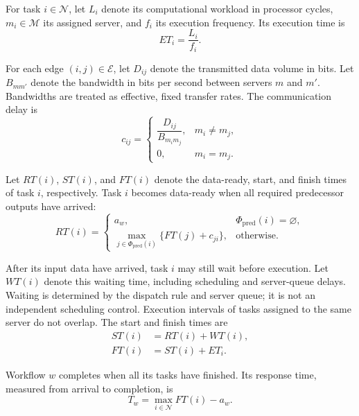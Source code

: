 \documentclass[lettersize,journal]{IEEEtran}
\begin{document}
For task $i\in\mathcal{N}$, let $L_i$ denote its computational
workload in processor cycles, $m_i\in\mathcal{M}$ its assigned
server, and $f_i$ its execution frequency.
Its execution time is
\begin{equation}
    ET_i=\frac{L_i}{f_i}.
    \label{eq:execution_time}
\end{equation}

For each edge $(i,j)\in\mathcal{E}$, let $D_{ij}$ denote
the transmitted data volume in bits.
Let $B_{mm'}$ denote the bandwidth in bits per second
between servers $m$ and $m'$. Bandwidths are treated as effective,
fixed transfer rates.
The communication delay is
\begin{equation}
    c_{ij}=
    \begin{cases}
        \dfrac{D_{ij}}{B_{m_i m_j}}, & m_i\neq m_j,\\[2mm]
        0, & m_i=m_j.
    \end{cases}
    \label{eq:communication_delay}
\end{equation}

Let $RT(i)$, $ST(i)$, and $FT(i)$ denote the data-ready,
start, and finish times of task $i$, respectively.
Task $i$ becomes data-ready when all required predecessor
outputs have arrived:
\begin{equation}
    RT(i)=
    \begin{cases}
        a_w, & \Phi_{\mathrm{pred}}(i)=\varnothing,\\[2mm]
        \displaystyle
        \max_{j\in\Phi_{\mathrm{pred}}(i)}
        \{FT(j)+c_{ji}\}, & \text{otherwise}.
    \end{cases}
    \label{eq:ready_time}
\end{equation}

After its input data have arrived, task $i$ may still wait
before execution. Let $WT(i)$ denote this waiting time,
including scheduling and server-queue delays.
Waiting is determined by the dispatch rule and server queue; it is
not an independent scheduling control. Execution intervals of tasks
assigned to the same server do not overlap.
The start and finish times are
\begin{align}
    ST(i)&=RT(i)+WT(i), \label{eq:start_time}\\
    FT(i)&=ST(i)+ET_i. \label{eq:finish_time}
\end{align}

Workflow $w$ completes when all its tasks have finished.
Its response time, measured from arrival to completion, is
\begin{equation}
    T_w=\max_{i\in\mathcal{N}}FT(i)-a_w.
    \label{eq:workflow_makespan}
\end{equation}
\end{document}
